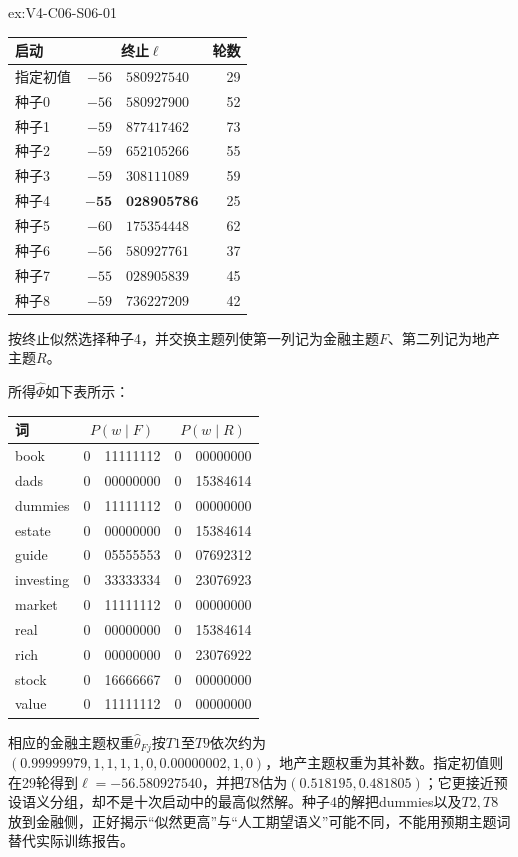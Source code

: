 \begin{SLChapterExercisePairSection}
\begin{chapterexercisesolution}{ex:V4-C06-S06-01}
\begin{center}
\small
\begin{tabular}{@{}l r@{.}l r@{}}
\toprule 启动 & \multicolumn{2}{c}{终止$\ell$} & 轮数\\ \midrule
指定初值 & $-56$&$580927540$ & 29\\
种子0 & $-56$&$580927900$ & 52\\
种子1 & $-59$&$877417462$ & 73\\
种子2 & $-59$&$652105266$ & 55\\
种子3 & $-59$&$308111089$ & 59\\
种子4 & $\mathbf{-55}$&$\mathbf{028905786}$ & 25\\
种子5 & $-60$&$175354448$ & 62\\
种子6 & $-56$&$580927761$ & 37\\
种子7 & $-55$&$028905839$ & 45\\
种子8 & $-59$&$736227209$ & 42\\ \bottomrule
\end{tabular}
\end{center}

按终止似然选择种子4，并交换主题列使第一列记为金融主题$F$、第二列记为地产主题$R$。

\noindent 所得$\widehat\Phi$如下表所示：
\begin{center}
\small
\begin{tabular}{@{}l r@{.}l r@{.}l@{}}
\toprule 词 & \multicolumn{2}{c}{$P(w\mid F)$} & \multicolumn{2}{c}{$P(w\mid R)$}\\ \midrule
book&0&11111112&0&00000000\\ dads&0&00000000&0&15384614\\ dummies&0&11111112&0&00000000\\
estate&0&00000000&0&15384614\\ guide&0&05555553&0&07692312\\ investing&0&33333334&0&23076923\\
market&0&11111112&0&00000000\\ real&0&00000000&0&15384614\\ rich&0&00000000&0&23076922\\
stock&0&16666667&0&00000000\\ value&0&11111112&0&00000000\\ \bottomrule
\end{tabular}
\end{center}
相应的金融主题权重$\widehat\theta_{Fj}$按$T1$至$T9$依次约为
$(0.99999979,1,1,1,1,0,0.00000002,1,0)$，地产主题权重为其补数。指定初值则在29轮得到$\ell=-56.580927540$，并把$T8$估为$(0.518195,0.481805)$；它更接近预设语义分组，却不是十次启动中的最高似然解。种子4的解把dummies以及$T2,T8$放到金融侧，正好揭示“似然更高”与“人工期望语义”可能不同，不能用预期主题词替代实际训练报告。


\end{chapterexercisesolution}
\end{SLChapterExercisePairSection}
